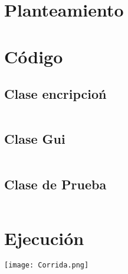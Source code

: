 \documentclass[12pt]{article}
\author{Pablo Vargas Bermúdez}
\begin{document}
\section{Planteamiento}

\section{Código}

\subsection{Clase encripcioń}

\inputminted{Java}{Encripcion.java}

\subsection{Clase Gui}

\inputminted{Java}{Gui,java}

\subsection{Clase de Prueba}

\inputminted{Java}{Prueba.java}

\section{Ejecución}

\texttt{[image: Corrida.png]}
\end{document}
